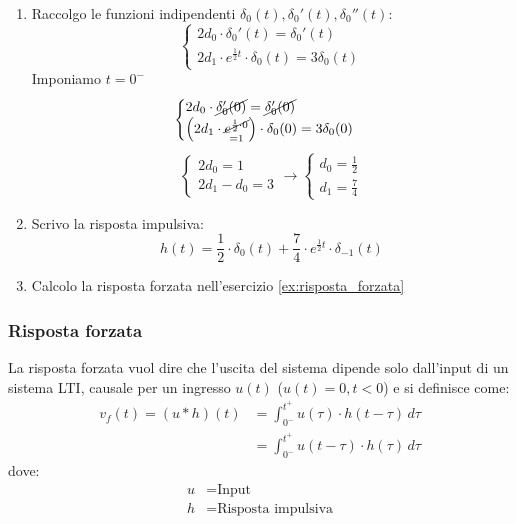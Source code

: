 \documentclass[a4paper]{article}
\begin{document}
\begin{exercise}
\begin{enumerate}
    \item Raccolgo le funzioni indipendenti \( \delta_0(t), \delta_0'(t), \delta_0''(t) \):
      \[
      \begin{cases}
        2d_0 \cdot \delta_0'(t) = \delta_0'(t)\\
        2d_1 \cdot e^{\frac{1}{2}t} \cdot \delta_0(t) = 3\delta_0(t)
      \end{cases}
      \] 
      Imponiamo \( t = 0^- \) 
      \[
      \begin{cases}
        2d_0 \cdot \cancel{\delta_0'(0)} = \cancel{\delta_0'(0)}\\
        \left( 2d_1 \cdot \underset{=1}{\cancel{e^{\frac{1}{2} \cdot 0}}} \right) \cdot \delta_0(0) = 3\delta_0(0)
      \end{cases}
      \] 
      \[
      \begin{cases}
        2d_0 = 1\\
        2d_1 - d_0 = 3
      \end{cases}
      \to 
      \begin{cases}
        d_0 = \frac{1}{2}\\
        d_1 = \frac{7}{4}
      \end{cases}
      \] 

    \item Scrivo la risposta impulsiva:
      \[
        h(t) = \frac{1}{2} \cdot \delta_0(t) + \frac{7}{4} \cdot e^{\frac{1}{2}t} \cdot \delta_{-1}(t)
      \]
    \item Calcolo la risposta forzata nell'esercizio \ref{ex:risposta_forzata}
  \end{enumerate}
  \label{ex:risposta_impulsiva_2}
\end{exercise}

\subsubsection{Risposta forzata}
\begin{definition}
  La risposta forzata vuol dire che l'uscita del sistema dipende solo dall'input di un
  sistema LTI, causale per un ingresso \( u(t) \) (\( u(t) = 0, t < 0 \)) e si definisce
  come:
  \[
    \begin{aligned}
      v_f(t) = (u \ast h)(t) &= \int_{0^-}^{t^+} u(\tau) \cdot h(t-\tau) \, d\tau\\
                             &= \int_{0^-}^{t^+} u(t-\tau) \cdot h(\tau) \, d\tau
    \end{aligned}
  \] 
  dove:
  \[
  \begin{aligned}
    u &= \text{Input}\\
    h &= \text{Risposta impulsiva}\\
  \end{aligned}
  \] 
\end{definition}
\end{document}
